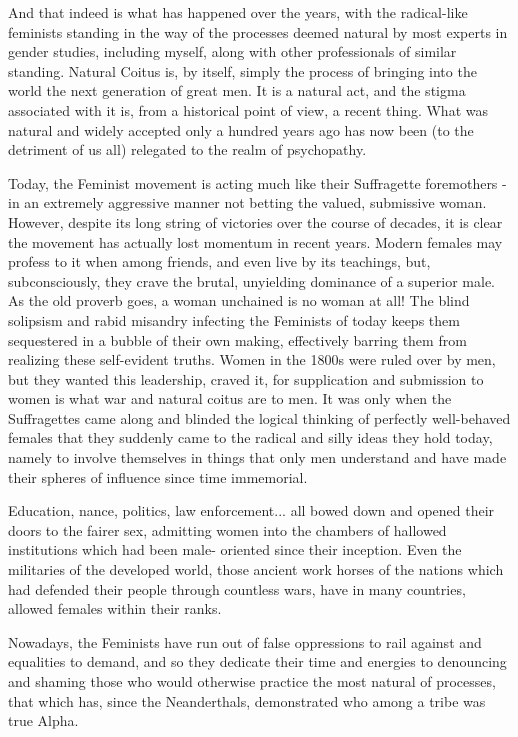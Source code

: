 And that indeed is what has happened over the years, with the radical-like feminists standing in the way of the processes deemed natural by most experts in gender studies, including myself, along with other professionals of similar standing. Natural Coitus is, by itself, simply the process of bringing into the world the next generation of great men. It is a natural act, and the stigma associated with it is, from a historical point of view, a recent thing. What was natural and widely accepted only a hundred years ago has now been (to the detriment of us all) relegated to the realm of psychopathy.


Today, the Feminist movement is acting much like their Suffragette foremothers - in an
extremely aggressive manner not betting the valued, submissive woman. However, despite its
long string of victories over the course of decades, it is clear the movement has actually lost
momentum in recent years. Modern females may profess to it when among friends, and even live by its teachings, but, subconsciously, they crave the brutal, unyielding dominance of a superior male.
As the old proverb goes, a woman unchained is no woman at all! 
The blind solipsism and rabid misandry infecting the Feminists of today keeps them sequestered in a bubble of their own making, effectively barring them from realizing these self-evident truths. Women in the 1800s were ruled over by men, but they wanted this leadership, craved it, for supplication and submission to women is what war and natural coitus are to men. It was only when the Suffragettes came along and blinded the logical thinking of perfectly well-behaved females that they suddenly came to the radical and silly ideas they hold today, namely to involve themselves in things that only men understand and have made their spheres of influence since time immemorial.


Education, nance, politics, law enforcement... all bowed down and opened their doors to
the fairer sex, admitting women into the chambers of hallowed institutions which had been male-
oriented since their inception. Even the militaries of the developed world, those ancient work
horses of the nations which had defended their people through countless wars, have in many
countries, allowed females within their ranks.


Nowadays, the Feminists have run out of false oppressions to rail against and equalities to demand, and so they dedicate their time and energies to denouncing and shaming those who
would otherwise practice the most natural of processes, that which has, since the Neanderthals,
demonstrated who among a tribe was true Alpha.


